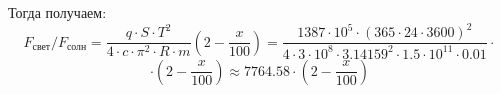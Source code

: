 Тогда получаем:
  $$F_{\text{свет}}/F_{\text{солн}} = \dfrac{q \cdot S \cdot T^2}{4 \cdot c \cdot \pi^2 \cdot R \cdot m} \left(2-\dfrac{x}{100}\right)=\dfrac{1387 \cdot 10^5 \cdot (365 \cdot 24 \cdot 3600)^2}{4 \cdot 3 \cdot 10^8 \cdot 3.14159^2 \cdot 1.5 \cdot 10^{11} \cdot 0.01} \cdot$$  
  $$\cdot \left(2-\dfrac{x}{100}\right) \approx 7764.58 \cdot (2-\dfrac{x}{100})$$

